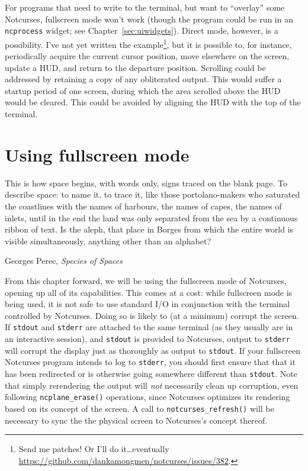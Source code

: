 \documentclass[letterpaper,10pt]{article}
\begin{document}
For programs that need to write to the terminal, but want to ``overlay'' some
Notcurses, fullscreen mode won't work (though the program could be run in an
\texttt{ncprocess} widget; see Chapter~\ref{sec:uiwidgets}). Direct mode, however, is
a possibility. I've not yet written the example\footnote{Send me patches! Or
I'll do it\ldots eventually \url{https://github.com/dankamongmen/notcurses/issues/382}.}, but it is possible to, for
instance, periodically acquire the current cursor position, move elsewhere on
the screen, update a HUD, and return to the departure position. Scrolling could
be addressed by retaining a copy of any obliterated output. This would suffer
a startup period of one screen, during which the area scrolled above the HUD
would be cleared. This could be avoided by aligning the HUD with the top of
the terminal.

\newpage

\section{Using fullscreen mode}
\label{sec:fullscreen}
\epigraph{This is how space begins, with words only, signs traced on the blank page. To describe space: to name it, to trace it, like those portolano-makers who saturated the coastlines with the names of harbours, the names of capes, the names of inlets, until in the end the land was only separated from the sea by a continuous ribbon of text. Is the aleph, that place in Borges from which the entire world is visible simultaneously, anything other than an alphabet?}{Georges Perec, \textit{Species of Spaces}}
From this chapter forward, we will be using the fullscreen mode of Notcurses,
opening up all of its capabilities. This comes at a cost: while fullscreen mode
is being used, it is not safe to use standard I/O in conjunction with the
terminal controlled by Notcurses. Doing so is likely to (at a minimum) corrupt
the screen. If \texttt{stdout} and \texttt{stderr} are attached to the same
terminal (as they usually are in an interactive session), and \texttt{stdout}
is provided to Notcurses, output to \texttt{stderr} will corrupt the display
just as thoroughly as output to \texttt{stdout}. If your fullscreen Notcurses
program intends to log to \texttt{stderr}, you should first ensure that that
it has been redirected or is otherwise going somewhere different than
\texttt{stdout}. Note that simply rerendering the output will \textit{not}
necessarily clean up corruption, even following \texttt{ncplane\_erase()}
operations, since Notcurses optimizes its rendering based on its concept of the
screen. A call to \texttt{notcurses\_refresh()} will be necessary to sync the
the physical screen to Notcurses's concept thereof.
\end{document}

